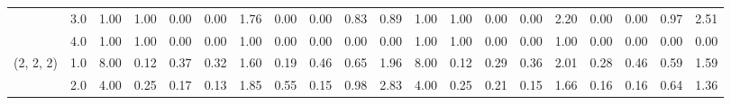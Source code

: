 \begin{tabular}{llrrrrrrrrrrrrrrrrrr}
          & 3.0 &               1.00 &                     1.00 &                                 0.00 &                             0.00 &                           1.76 &                                               0.00 &                                            0.00 &                                            0.83 &                                        0.89 &               1.00 &                     1.00 &                                 0.00 &                             0.00 &                           2.20 &                                               0.00 &                                            0.00 &                                            0.97 &                                        2.51 \\
          & 4.0 &               1.00 &                     1.00 &                                 0.00 &                             0.00 &                           1.00 &                                               0.00 &                                            0.00 &                                            0.00 &                                        0.00 &               1.00 &                     1.00 &                                 0.00 &                             0.00 &                           1.00 &                                               0.00 &                                            0.00 &                                            0.00 &                                        0.00 \\
(2, 2, 2) & 1.0 &               8.00 &                     0.12 &                                 0.37 &                             0.32 &                           1.60 &                                               0.19 &                                            0.46 &                                            0.65 &                                        1.96 &               8.00 &                     0.12 &                                 0.29 &                             0.36 &                           2.01 &                                               0.28 &                                            0.46 &                                            0.59 &                                        1.59 \\
          & 2.0 &               4.00 &                     0.25 &                                 0.17 &                             0.13 &                           1.85 &                                               0.55 &                                            0.15 &                                            0.98 &                                        2.83 &               4.00 &                     0.25 &                                 0.21 &                             0.15 &                           1.66 &                                               0.16 &                                            0.16 &                                            0.64 &                                        1.36 \\

\end{tabular}
